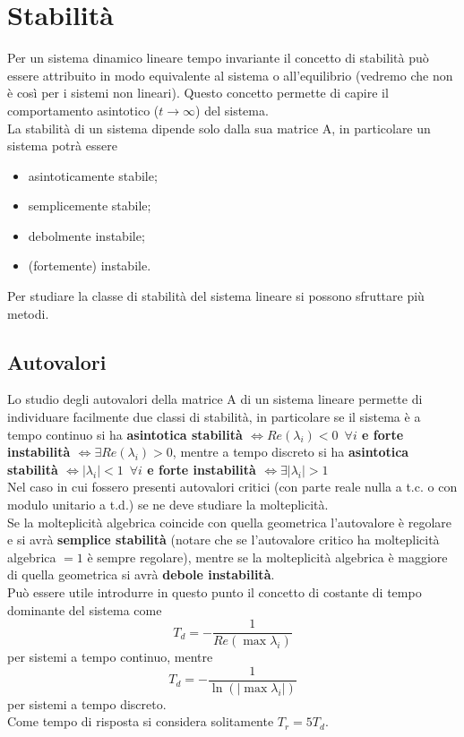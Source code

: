 \documentclass[a4paper]{article}
\begin{document}
	\section{Stabilità}
	Per un sistema dinamico lineare tempo invariante il concetto di stabilità può essere attribuito in modo equivalente al sistema o all'equilibrio (vedremo che non è così per i sistemi non lineari). Questo concetto permette di capire il comportamento asintotico ($t\to\infty$) del sistema.\\ La stabilità di un sistema dipende solo dalla sua matrice A, in particolare un sistema potrà essere 
	\begin{itemize}
		\item asintoticamente stabile;
		\item semplicemente stabile;
		\item debolmente instabile;
		\item (fortemente) instabile.
	\end{itemize}
	Per studiare la classe di stabilità del sistema lineare si possono sfruttare più metodi.
	
	\subsection{Autovalori} \label{Autovalori}
	Lo studio degli autovalori della matrice A di un sistema lineare permette di individuare facilmente due classi di stabilità, in particolare se il sistema è a tempo continuo si ha \textbf{asintotica stabilità $\Leftrightarrow Re(\lambda_i)<0\,\,\, \forall i$ e forte instabilità $\Leftrightarrow \exists Re(\lambda_i)>0$}, mentre a tempo discreto si ha \textbf{asintotica stabilità $\Leftrightarrow |\lambda_i|<1\,\,\, \forall i$ e forte instabilità $\Leftrightarrow \exists |\lambda_i|>1$}
	\\Nel caso in cui fossero presenti autovalori critici (con parte reale nulla a t.c. o con modulo unitario a t.d.) se ne deve studiare la molteplicità.
	\\Se la molteplicità algebrica coincide con quella geometrica l'autovalore è regolare e si avrà \textbf{semplice stabilità} (notare che se l'autovalore critico ha molteplicità algebrica $=1$ è sempre regolare), mentre se la molteplicità algebrica è maggiore di quella geometrica si avrà \textbf{debole instabilità}.
	\\Può essere utile introdurre in questo punto il concetto di costante di tempo dominante del sistema come \[T_d=-\dfrac{1}{Re(\max \lambda_i)}\] per sistemi a tempo continuo, mentre \[T_d=-\dfrac{1}{\ln(|\max\lambda_i|)}\] per sistemi a tempo discreto.\\Come tempo di risposta si considera solitamente $T_r=5T_d$.
	
\end{document}
